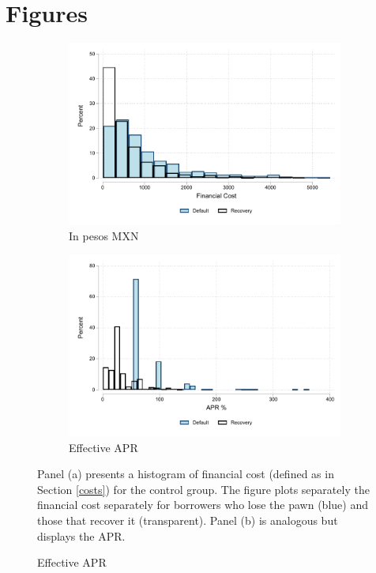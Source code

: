 \documentclass[oneside,11pt]{article}
\begin{document}

\newpage
\section{Figures}




\vspace{.2in}
\begin{figure}[H]
     \caption{Financial cost}
    \label{fc_hist}
    \begin{center}
    \begin{subfigure}{.45\textwidth}
      \caption{In pesos MXN}
        \centering
        \includegraphics[width=\textwidth]{Figuras/hist_fc.pdf}
    \end{subfigure}
     \begin{subfigure}{0.45\textwidth}
    \caption{Effective APR}
       \centering
      \includegraphics[width=\textwidth]{Figuras/hist_apr.pdf}
    \end{subfigure}
    \end{center}
         \scriptsize
         Panel (a) presents a histogram of financial cost (defined as in Section \ref{costs}) for the control group. The figure plots separately the financial cost separately for borrowers who lose the pawn (blue) and those that recover it (transparent).  Panel (b) is analogous but displays the APR.  %
       

\end{figure}
\end{document}
